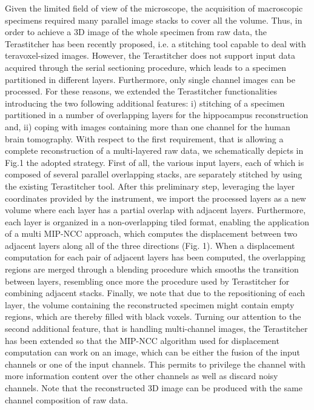 \documentclass[12pt]{spieman}  %
\begin{document}
Given the limited field of view of the microscope, the acquisition of macroscopic specimens required many parallel image stacks to cover all the volume. Thus, in order to achieve a 3D image of the whole specimen from raw data, the Terastitcher\cite{Bria2012} has been recently proposed, i.e. a stitching tool capable to deal with teravoxel-sized images. However, the Terastitcher does not support input data acquired through the serial sectioning procedure, which leads to a specimen partitioned in different layers. Furthermore, only single channel images can be processed. For these reasons, we extended the Terastitcher functionalities introducing the two following additional features: i) stitching of a specimen partitioned in a number of overlapping layers for the hippocampus reconstruction and, ii) coping with images containing more than one channel for the human brain tomography.
With respect to the first requirement, that is allowing a complete reconstruction of a multi-layered raw data, we schematically depicts in Fig.1 the adopted strategy. First of all, the various input layers, each of which is composed of several parallel overlapping stacks, are separately stitched by using the existing Terastitcher tool. After this preliminary step,  leveraging the layer coordinates provided by the instrument, we import the processed layers as a new volume where each layer has a partial overlap with adjacent layers.  Furthermore, each layer is organized in a non-overlapping tiled format, enabling the application of a multi MIP-NCC approach\cite{Bria2012}, which computes the displacement  between two adjacent layers along all of the three directions (Fig. 1). When a displacement computation for each pair of adjacent layers has been computed, the overlapping regions are merged through a blending procedure which smooths the transition between layers, resembling once more the procedure used by Terastitcher for combining adjacent stacks. Finally, we note that due to the repositioning of each layer, the volume containing the reconstructed specimen might contain empty regions, which are thereby filled with black voxels. 
Turning our attention to the second additional feature, that is handling multi-channel images, the Terastitcher has been extended so that the MIP-NCC algorithm used for displacement computation can work on an image, which can be either 
the fusion of the input channels or one of the input channels. This permits to privilege the channel with more information content over the other channels as well as discard noisy channels. Note that the reconstructed 3D image can be produced with the same channel composition of raw data.
\end{document}
